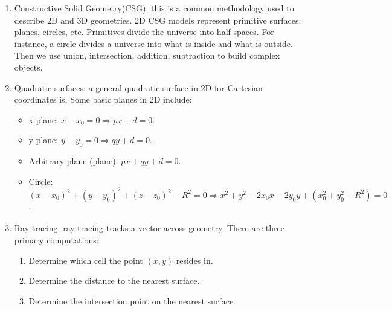 \documentclass{school-22.211-notes}
\begin{document}
\clearpage
{}
\begin{enumerate}
\item Constructive Solid Geometry(CSG): this is a common methodology used to describe 2D and 3D geometries. 2D CSG models represent primitive surfaces: planes, circles, etc. Primitives divide the universe into half-spaces. For instance, a circle divides a universe into what is inside and what is outside. Then we use union, intersection, addition, subtraction to build complex objects. 


\item Quadratic surfaces: a general quadratic surface in 2D for Cartesian coordinates is, 
  Some basic planes in 2D include: 
  \begin{itemize}
    \item x-plane: $x-x_0 = 0 \Rightarrow px + d =0$. 
    \item y-plane: $y-y_0 = 0 \Rightarrow qy + d = 0$. 
    \item Arbitrary plane (plane): $px + qy + d =0$. 
    \item Circle: $(x-x_0)^2 + (y-y_0)^2 + (z-z_0)^2 - R^2  = 0 \Rightarrow x^2 + y^2 - 2x_0 x - 2y_0 y + (x_0^2 + y_0^2 - R^2) = 0$. 
  \end{itemize}

\item Ray tracing: ray tracing tracks a vector across geometry. There are three primary computations: 
  \begin{enumerate}
    \item Determine which cell the point $(x,y)$ resides in. 
    \item Determine the distance to the nearest surface. 
    \item Determine the intersection point on the nearest surface. 
  \end{enumerate}
\end{enumerate}

\clearpage
\end{document}
